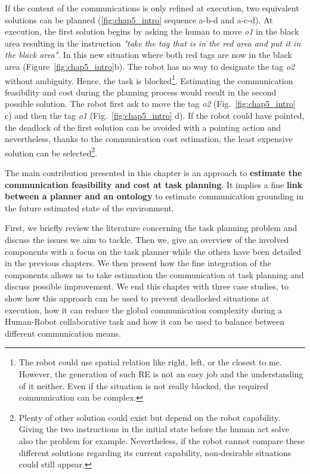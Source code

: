 If the content of the communications is only refined at execution, two equivalent solutions can be planned (\ref{fig:chap5_intro} sequence a-b-d and a-c-d). At execution, the first solution begins by asking the human to move \textit{o1} in the black area resulting in the instruction \textit{"take the tag that is in the red area and put it in the black area"}. In this new situation where both red tags are now in the black area (Figure~\ref{fig:chap5_intro}b). The robot has no way to designate the tag \textit{o2} without ambiguity. Hence, the task is blocked\footnote{The robot could use spatial relation like right, left, or the closest to me. However, the generation of such RE is not an easy job and the understanding of it neither. Even if the situation is not really blocked, the required communication can be complex. }. Estimating the communication feasibility and cost during the planning process would result in the second possible solution. The robot first ask to move the tag \textit{o2} (Fig.~\ref{fig:chap5_intro} c) and then the tag \textit{o1} (Fig.~\ref{fig:chap5_intro} d). If the robot could have pointed, the deadlock of the first solution can be avoided with a pointing action and nevertheless, thanks to the communication cost estimation, the least expensive solution can be selected\footnote{Plenty of other solution could exist but depend on the robot capability. Giving the two instructions in the initial state before the human act solve also the problem for example. Nevertheless, if the robot cannot compare these different solutions regarding its current capability, non-desirable situations could still appear.}.

The main contribution presented in this chapter is an approach to \textbf{estimate the communication feasibility and cost at task planning}. It implies a fine \textbf{link between a planner and an ontology} to estimate communication grounding in the future estimated state of the environment.

First, we briefly review the literature concerning the task planning problem and discuss the issues we aim to tackle. Then we, give an overview of the involved components with a focus on the task planner while the others have been detailed in the previous chapters. We then present how the fine integration of the components allows us to take estimation the communication at task planning and discuss possible improvement. We end this chapter with three case studies, to show how this approach can be used to prevent deadlocked situations at execution, how it can reduce the global communication complexity during a Human-Robot collaborative task and how it can be used to balance between different communication means.

